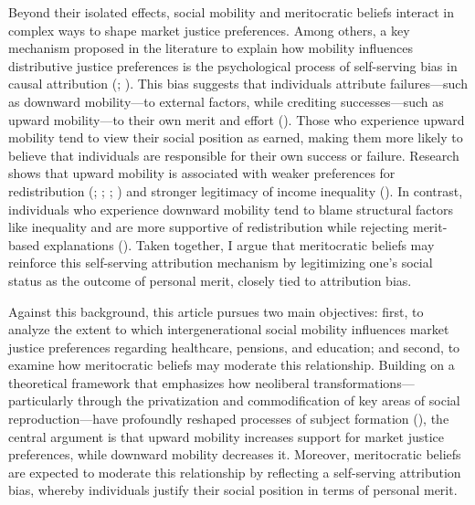 \documentclass[
  12pt,
]{article}
\begin{document}
Beyond their isolated effects, social mobility and meritocratic beliefs
interact in complex ways to shape market justice preferences. Among
others, a key mechanism proposed in the literature to explain how
mobility influences distributive justice preferences is the
psychological process of self-serving bias in causal attribution
(;
). This bias
suggests that individuals attribute failures---such as downward
mobility---to external factors, while crediting successes---such as
upward mobility---to their own merit and effort
(). Those
who experience upward mobility tend to view their social position as
earned, making them more likely to believe that individuals are
responsible for their own success or failure. Research shows that upward
mobility is associated with weaker preferences for redistribution
(;
;
; ) and stronger legitimacy of income inequality
(). In contrast,
individuals who experience downward mobility tend to blame structural
factors like inequality and are more supportive of redistribution while
rejecting merit-based explanations
(). Taken
together, I argue that meritocratic beliefs may reinforce this
self-serving attribution mechanism by legitimizing one's social status
as the outcome of personal merit, closely tied to attribution bias.

Against this background, this article pursues two main objectives:
first, to analyze the extent to which intergenerational social mobility
influences market justice preferences regarding healthcare, pensions,
and education; and second, to examine how meritocratic beliefs may
moderate this relationship. Building on a theoretical framework that
emphasizes how neoliberal transformations---particularly through the
privatization and commodification of key areas of social
reproduction---have profoundly reshaped processes of subject formation
(), the central argument is
that upward mobility increases support for market justice preferences,
while downward mobility decreases it. Moreover, meritocratic beliefs are
expected to moderate this relationship by reflecting a self-serving
attribution bias, whereby individuals justify their social position in
terms of personal merit.
\end{document}
